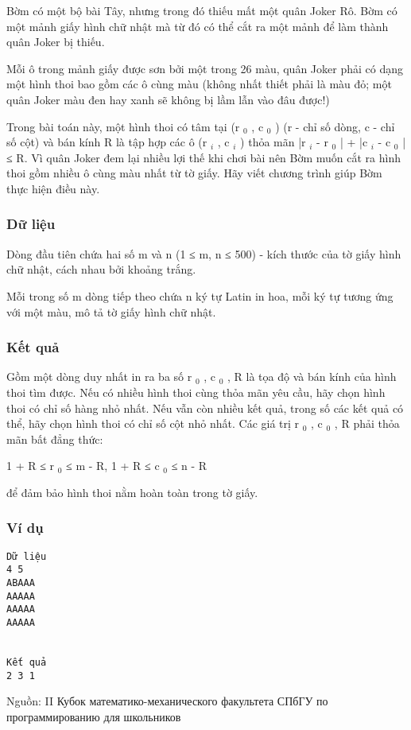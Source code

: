 



   Bờm có một bộ bài Tây, nhưng trong đó thiếu mất một quân Joker Rô. Bờm có một mảnh giấy hình chữ nhật mà từ đó có thể cắt ra một mảnh để làm thành quân Joker bị thiếu.  

   Mỗi ô trong mảnh giấy được sơn bởi một trong 26 màu, quân Joker phải có dạng một hình thoi bao gồm các ô cùng màu (không nhất thiết phải là màu đỏ; một quân Joker màu đen hay xanh sẽ không bị lầm lẫn vào đâu được!)  

   Trong bài toán này, một hình thoi có tâm tại (r   $_    0   $   , c   $_    0   $   ) (r - chỉ số dòng, c - chỉ số cột) và bán kính R là tập hợp các ô (r   $_    i   $   , c   $_    i   $   ) thỏa mãn |r   $_    i   $   - r   $_    0   $   | + |c   $_    i   $   - c   $_    0   $   | ≤ R. Vì quân Joker đem lại nhiều lợi thế khi chơi bài nên Bờm muốn cắt ra hình thoi gồm nhiều ô cùng màu nhất từ tờ giấy. Hãy viết chương trình giúp Bờm thực hiện điều này.  

\subsubsection{   Dữ liệu  }

   Dòng đầu tiên chứa hai số m và n (1 ≤ m, n ≤ 500) - kích thước của tờ giấy hình chữ nhật, cách nhau bởi khoảng trắng.  

   Mỗi trong số m dòng tiếp theo chứa n ký tự Latin in hoa, mỗi ký tự tương ứng với một màu, mô tả tờ giấy hình chữ nhật.  

\subsubsection{   Kết quả  }

   Gồm một dòng duy nhất in ra ba số r   $_    0   $   , c   $_    0   $   , R là tọa độ và bán kính của hình thoi tìm được. Nếu có nhiều hình thoi cùng thỏa mãn yêu cầu, hãy chọn hình thoi có chỉ số hàng nhỏ nhất. Nếu vẫn còn nhiều kết quả, trong số các kết quả có thể, hãy chọn hình thoi có chỉ số cột nhỏ nhất. Các giá trị r   $_    0   $   , c   $_    0   $   , R phải thỏa mãn bất đẳng thức:  

   1 + R ≤ r   $_    0   $   ≤ m - R, 1 + R ≤ c   $_    0   $   ≤ n - R  

   để đảm bảo hình thoi nằm hoàn toàn trong tờ giấy.  

\subsubsection{   Ví dụ  }
\begin{verbatim}
Dữ liệu
4 5
АВААА
ААААА
ААААА
ААААА


Kết quả
2 3 1
\end{verbatim}

   Nguồn: II Кубок математико-механического факультета СПбГУ по программированию для школьников  